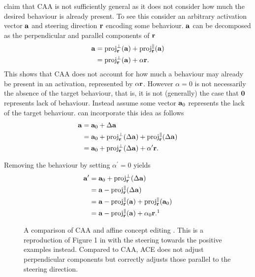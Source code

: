\citet{ace} claim that CAA \citep{caa} is not sufficiently general as it does not consider how much the desired behaviour is already present.
To see this consider an arbitrary activation vector $\mathbf{a}$ and steering direction $\mathbf{r}$ encoding some behaviour.
$\mathbf{a}$ can be decomposed as the perpendicular and parallel components of $\mathbf{r}$
\begin{equation}
    \label{eq:components}
    \begin{aligned}
        \mathbf{a} &= \text{proj}_{\mathbf{r}}^{\perp}(\mathbf{a}) + \text{proj}_{\mathbf{r}}^{\parallel}(\mathbf{a}) \\
            &= \text{proj}_{\mathbf{r}}^{\perp}(\mathbf{a}) + \alpha\mathbf{r}.
    \end{aligned}
\end{equation}
This shows that CAA \citep{caa} does not account for how much a behaviour may already be present in an activation, represented by $\alpha\mathbf{r}$.
However $\alpha = 0$ is not necessarily the absence of the target behaviour, that is, it is not (generally) the case that $\mathbf{0}$ represents lack of behaviour.
Instead assume some vector $\mathbf{a}_0$ represents the lack of the target behaviour.
 can incorporate this idea as follows
\begin{align*}
    \mathbf{a} &= \mathbf{a}_0 + \Delta\mathbf{a} \\
        &= \mathbf{a}_0 + \text{proj}_{\mathbf{r}}^{\perp}(\Delta\mathbf{a}) + \text{proj}_{\mathbf{r}}^{\parallel}(\Delta\mathbf{a}) \\
        &= \mathbf{a}_0 + \text{proj}_{\mathbf{r}}^{\perp}(\Delta\mathbf{a}) + \alpha^\prime\mathbf{r}.
\end{align*}

Removing the behaviour by setting $\alpha^\prime = 0$ yields
\begin{align*}
    \va^\prime &= \va_0 + \text{proj}_\vr^{\perp}(\Delta\va) \\
               &= \va - \text{proj}_\vr^{\parallel}(\Delta\va) \\
               &= \va - \text{proj}_\vr^{\parallel}(\va) + \text{proj}_\vr^{\parallel}(\va_0) \\
               &= \va - \text{proj}_\vr^{\parallel}(\va) + \alpha_0\vr.\footnotemark[1]
\end{align*}

\begin{figure}
    \centering
    \captionsetup{width=.9\textwidth}
    
    \caption{A comparison of CAA \citep{caa} and affine concept editing \citep{ace}. This is a reproduction of Figure 1 in \citet{ace} with the steering towards the positive examples instead. Compared to CAA, ACE does not adjust perpendicular components but correctly adjusts those parallel to the steering direction.}
    \label{fig:ace}
\end{figure}

